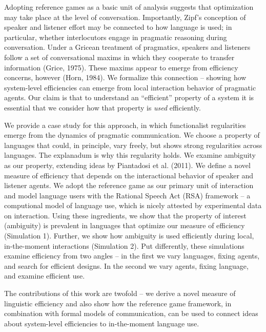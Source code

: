 \documentclass[10pt, letterpaper]{article}
\begin{document}
Adopting reference games as a basic unit of analysis suggests that
optimization may take place at the level of conversation. Importantly,
Zipf's conception of speaker and listener effort may be connected to how
language is used; in particular, whether interlocutors engage in
pragmatic reasoning during conversation. Under a Gricean treatment of
pragmatics, speakers and listeners follow a set of conversational maxims
in which they cooperate to transfer information (Grice, 1975). These
maxims appear to emerge from efficiency concerns, however (Horn, 1984).
We formalize this connection -- showing how system-level efficiencies
can emerge from local interaction behavior of pragmatic agents. Our
claim is that to understand an ``efficient'' property of a system it is
essential that we consider how that property is \emph{used}
efficiently.\par

We provide a case study for this approach, in which functionalist
regularities emerge from the dynamics of pragmatic communication. We
choose a property of languages that could, in principle, vary freely,
but shows strong regularities across languages. The explanadum is why
this regularity holds. We examine ambiguity as our property, extending
ideas by Piantadosi et al. (2011). We define a novel measure of
efficiency that depends on the interactional behavior of speaker and
listener agents. We adopt the reference game as our primary unit of
interaction and model language users with the Rational Speech Act (RSA)
framework -- a computional model of language use, which is nicely
attested by experimental data on interaction. Using these ingredients,
we show that the property of interest (ambiguity) is prevalent in
languages that optimize our measure of efficiency (Simulation 1).
Further, we show how ambiguity is used efficiently during local,
in-the-moment interactions (Simulation 2). Put differently, these
simulations examine efficiency from two angles -- in the first we vary
languages, fixing agents, and search for efficient designs. In the
second we vary agents, fixing language, and examine efficient use. \par

The contributions of this work are twofold -- we derive a novel measure
of linguistic efficiency and also show how the reference game framework,
in combination with formal models of communication, can be used to
connect ideas about system-level efficiencies to in-the-moment language
use.\par
\end{document}
